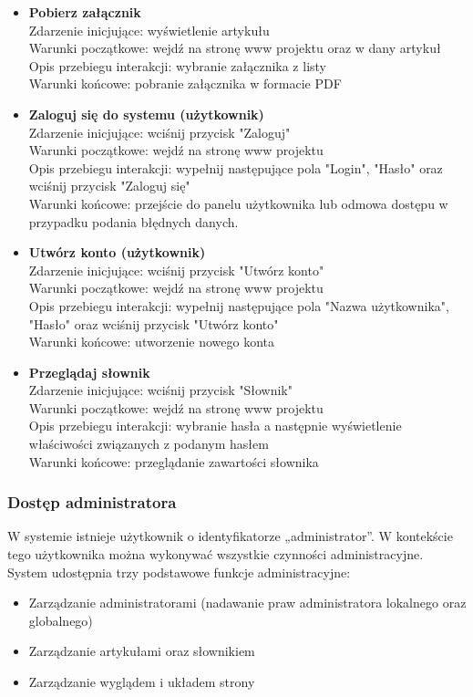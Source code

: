 \documentclass{article}
\begin{document}
\begin{itemize}
	
	\item \textbf{Pobierz załącznik}
	\\Zdarzenie inicjujące: wyświetlenie artykułu
	\\Warunki początkowe: wejdź na stronę www projektu oraz w dany artykuł
	\\Opis przebiegu interakcji: wybranie załącznika z listy
	\\Warunki końcowe: pobranie załącznika w formacie PDF
	
	\item \textbf{Zaloguj się do systemu (użytkownik)}	
	\\Zdarzenie inicjujące: wciśnij przycisk "Zaloguj"	
	\\Warunki początkowe: wejdź na stronę www projektu	
	\\Opis przebiegu interakcji: wypełnij następujące pola "Login", "Hasło" oraz wciśnij przycisk "Zaloguj się"	
	\\Warunki końcowe: przejście do panelu użytkownika lub odmowa dostępu w przypadku podania błędnych danych.
	
	\item \textbf{Utwórz konto (użytkownik)}	
	\\Zdarzenie inicjujące: wciśnij przycisk "Utwórz konto"	
	\\Warunki początkowe: wejdź na stronę www projektu	
	\\Opis przebiegu interakcji: wypełnij następujące pola "Nazwa użytkownika", "Hasło" oraz wciśnij przycisk "Utwórz konto"	
	\\Warunki końcowe: utworzenie nowego konta
	
	\item \textbf{Przeglądaj słownik}	
	\\Zdarzenie inicjujące: wciśnij przycisk "Słownik"	
	\\Warunki początkowe: wejdź na stronę www projektu	
	\\Opis przebiegu interakcji: wybranie hasła a następnie wyświetlenie właściwości związanych z podanym hasłem	
	\\Warunki końcowe: przeglądanie zawartości słownika	
	
		
\end{itemize}
	
\subsubsection{Dostęp administratora}
	
	W systemie istnieje użytkownik o identyfikatorze „administrator”. W kontekście tego użytkownika można wykonywać wszystkie czynności administracyjne. System udostępnia trzy podstawowe funkcje administracyjne:
\begin{itemize}
	\item Zarządzanie administratorami (nadawanie praw administratora lokalnego oraz globalnego)
	\item Zarządzanie artykułami oraz słownikiem
	\item Zarządzanie wyglądem i układem strony
\end{itemize}
\end{document}
